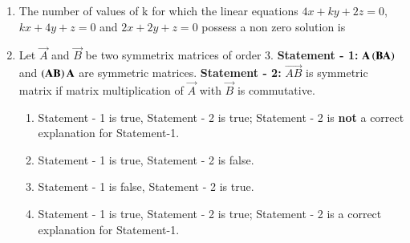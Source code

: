 \documentclass[journal,onecolumn]{IEEEtran}
\theoremstyle{remark}
\begin{document}
\begin{enumerate}
    \item The number of values of k for which the linear equations $4x + ky + 2z = 0$, $kx + 4y + z = 0$ and $2x + 2y + z=0$ possess a non zero solution is 
	\hfill {}{\par}
        \begin{enumerate}
        \end{enumerate}

\item Let $\vec{A}$ and $\vec{B}$ be two symmetrix matrices of order $3$.
	\newline
	\textbf{Statement - 1:} $\mathbf{A}\left(\mathbf{BA}\right)$ and $\left(\mathbf{AB}\right)\mathbf{A}$ are symmetric matrices. 
	\newline
	\textbf{Statement - 2:} $\vec{AB}$ is symmetric matrix if matrix multiplication of $\vec{A}$ with $\vec{B}$ is commutative.

	\begin{enumerate}
		\item Statement - 1 is true, Statement - 2 is true; Statement - 2 is \textbf{not} a correct explanation for Statement-1. 
	    	\item Statement - 1 is true, Statement - 2 is false. 
	    	\item Statement - 1 is false, Statement - 2 is true.
	    	\item Statement - 1 is true, Statement - 2 is true; Statement - 2 is a correct explanation for Statement-1. 
	\end{enumerate}


\end{enumerate}
\end{document}
